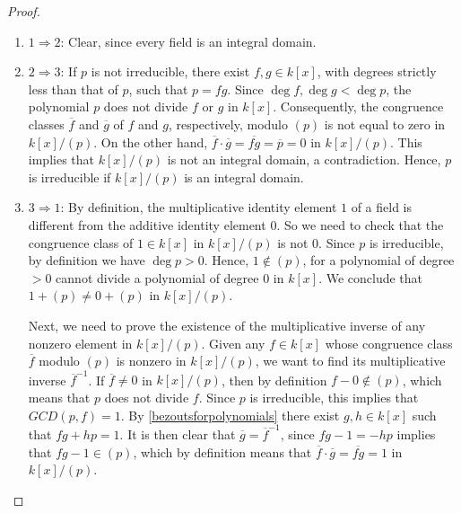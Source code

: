 \documentclass[a4paper,12pt]{report}
\newcommand{\ol}[1]{\overline{#1}}
\numberwithin{statement}{chapter}
\numberwithin{equation}{chapter}
\numberwithin{section}{chapter}
\numberwithin{subsection}{section}
\begin{document}
\begin{proof}

\begin{enumerate}
\item 
$1 \Rightarrow 2$: Clear, since every field is an integral domain.

\item 
$2 \Rightarrow 3$: If $p$ is not irreducible, there exist $f, g \in k[x]$,
with degrees strictly less than that of $p$, such that $p = fg$.
Since $\deg f, \deg g < \deg p$, the polynomial $p$ does not divide $f$ or $g$
in $k[x]$.  Consequently, the congruence classes $\ol{f}$ and $\ol{g}$
of $f$ and $g$, respectively, modulo $(p)$ is not equal to zero in $k[x]/(p)$.
On the other hand, $\ol{f}\cdot \ol{g} = \ol{fg} = \ol{p} = 0$ in $k[x]/(p)$.
This implies that $k[x]/(p)$ is not an integral domain, a contradiction.
Hence, $p$ is irreducible if $k[x]/(p)$ is an integral domain.

\item 
$3 \Rightarrow 1$:
By definition, the multiplicative identity element $1$ of a field is different from the
additive identity element $0$.  So we need to check that the congruence class of $1 \in k[x]$
in $k[x]/(p)$ is not $0$.  Since $p$ is irreducible, by definition we have $\deg p > 0$.
Hence, $1 \notin (p)$, for a polynomial of degree $> 0$ cannot divide a polynomial of degree $0$
in $k[x]$.  We conclude that $1 + (p)\neq 0 + (p)$ in $k[x]/(p)$.





Next, we need to prove the existence of the multiplicative inverse of any nonzero element in
$k[x]/(p)$.
Given any $f \in k[x]$ whose congruence class $\ol{f}$ modulo $(p)$ is nonzero in $k[x]/(p)$,
we want to find its multiplicative inverse $\ol{f}^{-1}$.
If $\ol{f} \neq 0$ in $k[x]/(p)$, then by definition $f - 0 \notin (p)$, which means
that $p$ does not divide $f$.  Since $p$ is irreducible, this implies that
$GCD(p, f) = 1$.  By \cref{bezoutsforpolynomials} there exist
$g, h \in k[x]$ such that $fg + hp = 1$.  It is then clear that $\ol{g} = \ol{f}^{-1}$,
since $fg - 1 = -hp$ implies that $fg - 1 \in (p)$,
which by definition means that $\ol{f}\cdot\ol{g} = \ol{fg} = 1$ in $k[x]/(p)$.


\end{enumerate}

\end{proof}
\end{document}
